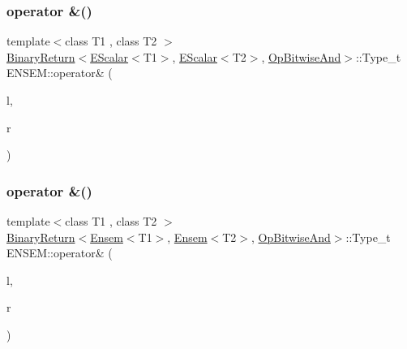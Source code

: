 \mbox{\label{namespaceENSEM_ga445352dd6ecea4dcb57bfd1abcda2a0b}} 
\subsubsection{\texorpdfstring{operator \&()}{operator \&()}\hspace{0.1cm}{\footnotesize\ttfamily [4/7]}}
{\footnotesize\ttfamily template$<$class T1 , class T2 $>$ \\
\mbox{\hyperlink{structENSEM_1_1BinaryReturn}{Binary\+Return}}$<$\mbox{\hyperlink{classENSEM_1_1EScalar}{E\+Scalar}}$<$T1$>$, \mbox{\hyperlink{classENSEM_1_1EScalar}{E\+Scalar}}$<$T2$>$, \mbox{\hyperlink{structENSEM_1_1OpBitwiseAnd}{Op\+Bitwise\+And}}$>$\+::Type\+\_\+t E\+N\+S\+E\+M\+::operator\& (\begin{DoxyParamCaption}\item[{const \mbox{\hyperlink{classENSEM_1_1EScalar}{E\+Scalar}}$<$ T1 $>$ \&}]{l,  }\item[{const \mbox{\hyperlink{classENSEM_1_1EScalar}{E\+Scalar}}$<$ T2 $>$ \&}]{r }\end{DoxyParamCaption})\hspace{0.3cm}{\ttfamily [inline]}}

\mbox{\label{namespaceENSEM_gaeb51787a8e99aa2d96b292b6b53160fb}} 
\subsubsection{\texorpdfstring{operator \&()}{operator \&()}\hspace{0.1cm}{\footnotesize\ttfamily [5/7]}}
{\footnotesize\ttfamily template$<$class T1 , class T2 $>$ \\
\mbox{\hyperlink{structENSEM_1_1BinaryReturn}{Binary\+Return}}$<$\mbox{\hyperlink{classENSEM_1_1Ensem}{Ensem}}$<$T1$>$, \mbox{\hyperlink{classENSEM_1_1Ensem}{Ensem}}$<$T2$>$, \mbox{\hyperlink{structENSEM_1_1OpBitwiseAnd}{Op\+Bitwise\+And}}$>$\+::Type\+\_\+t E\+N\+S\+E\+M\+::operator\& (\begin{DoxyParamCaption}\item[{const \mbox{\hyperlink{classENSEM_1_1Ensem}{Ensem}}$<$ T1 $>$ \&}]{l,  }\item[{const \mbox{\hyperlink{classENSEM_1_1Ensem}{Ensem}}$<$ T2 $>$ \&}]{r }\end{DoxyParamCaption})\hspace{0.3cm}{\ttfamily [inline]}}

